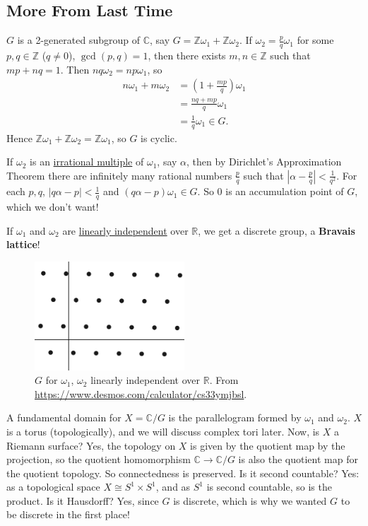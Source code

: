 \documentclass[12pt]{article}
\newcommand{\z}{\mathbb{Z}}
\newcommand{\cx}{\mathbb{C}}
\newcommand{\real}{\mathbb{R}}
\theoremstyle{definition}
\theoremstyle{remark}
\begin{document}
\subsection{More From Last Time}
$G$ is a 2-generated subgroup of $\cx$, say $G=\z\omega_1+\z\omega_2$. If $\omega_2=\frac{p}{q}\omega_1$ for some $p,q\in\z$ ($q\neq0$), $\gcd(p,q)=1$, then there exists $m,n\in\z$ such that $mp+nq=1$. Then $nq\omega_2=np\omega_1$, so 
\begin{equation}
    \begin{split}
        n\omega_1+m\omega_2&=\left(1+\frac{mp}{q}\right)\omega_1\\
        &=\frac{nq+mp}{q}\omega_1\\
        &=\frac{1}{q}\omega_1\in G.
    \end{split}
\end{equation}
Hence $\z\omega_1+\z\omega_2=\z\omega_1$, so $G$ is cyclic.

If $\omega_2$ is an \underline{irrational multiple} of $\omega_1$, say $\alpha$, then by Dirichlet's Approximation Theorem there are infinitely many rational numbers $\frac{p}{q}$ such that $\left|\alpha-\frac{p}{q}\right|<\frac{1}{q^2}$. For each $p,q$, $|q\alpha-p|<\frac{1}{q}$ and $(q\alpha-p)\omega_1\in G$. So 0 is an accumulation point of $G$, which we don't want!

If $\omega_1$ and $\omega_2$ are \underline{linearly independent} over $\real$, we get a discrete group, a \textbf{Bravais lattice}!
\begin{figure}[H]
    \centering
    \includegraphics[width=0.5\textwidth]{2.png}
    \caption{$G$ for $\omega_1$, $\omega_2$ linearly independent over $\real$. From \url{https://www.desmos.com/calculator/cs33ymjbsl}.}
    \label{fig:Fig2}
\end{figure}
A fundamental domain for $X=\cx/G$ is the parallelogram formed by $\omega_1$ and $\omega_2$. $X$ is a torus (topologically), and we will discuss complex tori later. 
Now, is $X$ a Riemann surface? Yes, the topology on $X$ is given by the quotient map by the projection, so the quotient homomorphism $\cx\to\cx/G$ is also the quotient map for the quotient topology. So connectedness is preserved. Is it second countable? Yes: as a topological space $X \cong S^1 \times S^1$, and as $S^1$ is second countable, so is the product. Is it Hausdorff? Yes, since $G$ is discrete, which is why we wanted $G$ to be discrete in the first place! 
\end{document}
